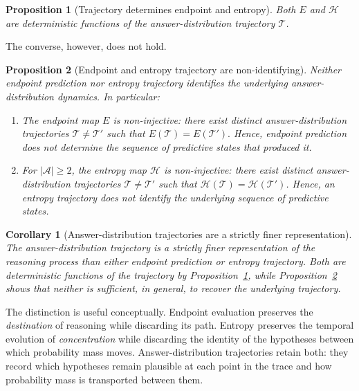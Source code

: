 \documentclass{article}
\newtheorem{corollary}{Corollary}
\newtheorem{proposition}{Proposition}
\begin{document}
\begin{proposition}[Trajectory determines endpoint and entropy]
\label{prop:projection}
Both \(E\) and \(\mathcal{H}\) are deterministic functions of the answer-distribution trajectory \(\mathcal{T}\).
\end{proposition}

The converse, however, does not hold.

\begin{proposition}[Endpoint and entropy trajectory are non-identifying]
\label{prop:nonidentifiability}
Neither endpoint prediction nor entropy trajectory identifies the underlying answer-distribution dynamics. In particular:

\begin{enumerate}
    \item The endpoint map \(E\) is non-injective: there exist distinct answer-distribution trajectories \(\mathcal{T}\neq\mathcal{T}'\) such that
    $
    E(\mathcal{T})=E(\mathcal{T}').
    $
    Hence, endpoint prediction does not determine the sequence of predictive states that produced it.
    \item For \(|\mathcal{A}|\geq 2\), the entropy map \(\mathcal{H}\) is non-injective: there exist distinct answer-distribution trajectories \(\mathcal{T} \neq \mathcal{T}'\) such that \(\mathcal{H}(\mathcal{T}) = \mathcal{H}(\mathcal{T}')\). Hence, an entropy trajectory does not identify the underlying sequence of predictive states.
\end{enumerate}
\end{proposition}


\begin{corollary}[Answer-distribution trajectories are a strictly finer representation]
\label{cor:finer}
The answer-distribution trajectory is a strictly finer representation of the reasoning process than either endpoint prediction or entropy trajectory. Both are deterministic functions of the trajectory by Proposition~\ref{prop:projection}, while Proposition~\ref{prop:nonidentifiability} shows that neither is sufficient, in general, to recover the underlying trajectory.
\end{corollary}

The distinction is useful conceptually. Endpoint evaluation preserves the \emph{destination} of reasoning while discarding its path. Entropy preserves the temporal evolution of \emph{concentration} while discarding the identity of the hypotheses between which probability mass moves. Answer-distribution trajectories retain both: they record which hypotheses remain plausible at each point in the trace and how probability mass is transported between them.
\end{document}
